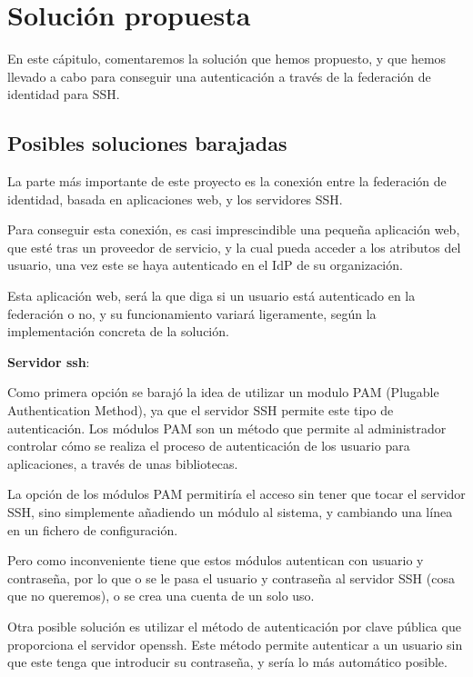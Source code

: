 \chapter{Solución propuesta}

    En este cápitulo, comentaremos la solución que hemos propuesto, y que
    hemos llevado a cabo para conseguir una autenticación a través de la
    federación de identidad para SSH.

    \section{Posibles soluciones barajadas}

    La parte más importante de este proyecto es la conexión entre la
    federación de identidad, basada en aplicaciones web, y los servidores
    SSH.

    Para conseguir esta conexión, es casi imprescindible una pequeña
    aplicación web, que esté tras un proveedor de servicio, y la cual pueda
    acceder a los atributos del usuario, una vez este se haya autenticado
    en el IdP de su organización.

    Esta aplicación web, será la que diga si un usuario está
    autenticado en la federación o no, y su funcionamiento variará
    ligeramente, según la implementación concreta de la solución.

    \textbf{Servidor ssh}:

    Como primera opción se barajó la idea de utilizar un modulo PAM
    (Plugable Authentication Method), ya que el servidor SSH permite este
    tipo de autenticación. Los módulos PAM son un método que permite al
    administrador controlar cómo se realiza el proceso de autenticación de
    los usuario para aplicaciones, a través de unas bibliotecas.

    La opción de los módulos PAM permitiría el acceso sin tener que tocar
    el servidor SSH, sino simplemente añadiendo un módulo al sistema, y
    cambiando una línea en un fichero de configuración.

    Pero como inconveniente tiene que estos módulos autentican con usuario
    y contraseña, por lo que o se le pasa el usuario y contraseña al
    servidor SSH (cosa que no queremos), o se crea una cuenta de un solo
    uso.

    Otra posible solución es utilizar el método de autenticación por clave
    pública que proporciona el servidor openssh. Este método permite
    autenticar a un usuario sin que este tenga que introducir su
    contraseña, y sería lo más automático posible.

